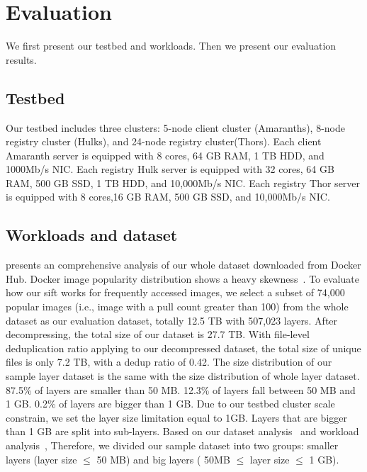 \section{ Evaluation}
\label{sec:Evaluation}


We first present our testbed and workloads.
Then we present our evaluation results.
\subsection{Testbed}

Our testbed includes three clusters: 
5-node client cluster (Amaranths),
8-node registry cluster (Hulks), and
24-node registry cluster(Thors).
Each client Amaranth server is equipped with 8 cores, 64 GB RAM, 1 TB HDD, and 1000Mb/s NIC.
Each registry Hulk server is equipped with 32 cores, 64 GB RAM, 500 GB SSD, 1 TB HDD, and 10,000Mb/s NIC. 
Each registry Thor server is equipped with 8 cores,16 GB RAM, 500 GB SSD, and 10,000Mb/s NIC. 
\subsection{Workloads and dataset}
\cite{xxx} presents an comprehensive analysis of our whole dataset downloaded from Docker Hub. 
Docker image popularity distribution shows a heavy skewness~\cite{xxx}.
To evaluate how our sift works for frequently accessed images,
we select a subset of 74,000 popular images (i.e., image with a pull count greater than 100) from the whole dataset 
as our evaluation dataset, 
totally 12.5 TB with 507,023 layers.
After decompressing,  the total size of our dataset is 27.7 TB.
With file-level deduplication ratio applying to our decompressed dataset, 
the total size of unique files is only 7.2 TB, with a dedup ratio of 0.42.
The size distribution of our sample layer dataset is the same with the size distribution of whole layer dataset.
87.5\% of layers are smaller than 50 MB.
12.3\% of layers fall between 50 MB and 1 GB.
0.2\% of layers are bigger than 1 GB.
Due to our testbed cluster scale constrain, we set the layer size limitation equal to 1GB. 
Layers that are bigger than 1 GB are split into sub-layers.
Based on our dataset analysis~\cite{xxx} and workload analysis~\cite{xxx},
Therefore, we divided our sample dataset into two groups:
smaller layers (layer size $\leq$ 50 MB) and big layers ( 50MB $\leq$ layer size $\leq$ 1 GB).

